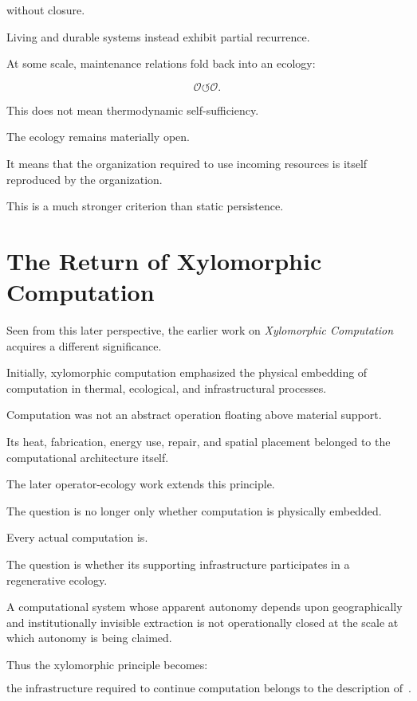 \documentclass[11pt]{article}
\theoremstyle{remark}
\begin{document}
without closure.

Living and durable systems instead exhibit partial recurrence.

At some scale, maintenance relations fold back into an ecology:

\begin{equation}
\mathcal{O}
\circlearrowleft
\mathcal{O}.
\end{equation}

This does not mean thermodynamic self-sufficiency.

The ecology remains materially open.

It means that the organization required to use incoming resources is itself reproduced by the organization.

This is a much stronger criterion than static persistence.

\section{The Return of Xylomorphic Computation}

Seen from this later perspective, the earlier work on \emph{Xylomorphic Computation} acquires a different significance.

Initially, xylomorphic computation emphasized the physical embedding of computation in thermal, ecological, and infrastructural processes.

Computation was not an abstract operation floating above material support.

Its heat, fabrication, energy use, repair, and spatial placement belonged to the computational architecture itself.

The later operator-ecology work extends this principle.

The question is no longer only whether computation is physically embedded.

Every actual computation is.

The question is whether its supporting infrastructure participates in a regenerative ecology.

A computational system whose apparent autonomy depends upon geographically and institutionally invisible extraction is not operationally closed at the scale at which autonomy is being claimed.

Thus the xylomorphic principle becomes:

\begin{equation}
\boxed{
\text{the infrastructure required to continue computation belongs to the description of the computation}.
}
\end{equation}
\end{document}
